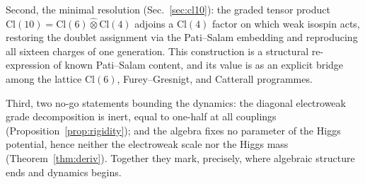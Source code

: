 \documentclass[12pt]{article}
\theoremstyle{remark}
\newcommand{\cl}{\mathrm{Cl}}
\newcommand{\grtensor}{\mathbin{\widehat{\otimes}}}  %
\begin{document}
Second, the minimal resolution (Sec.~\ref{sec:cl10}): the graded tensor product
$\cl(10)=\cl(6)\grtensor\cl(4)$ adjoins a $\cl(4)$ factor on which weak isospin
acts, restoring the doublet assignment via the Pati--Salam embedding and
reproducing all sixteen charges of one generation.  This construction is a
structural re-expression of known Pati--Salam content, and its value is as an
explicit bridge among the lattice $\cl(6)$, Furey--Gresnigt, and Catterall
programmes.

Third, two no-go statements bounding the dynamics: the diagonal electroweak
grade decomposition is inert, equal to one-half at all couplings
(Proposition~\ref{prop:rigidity}); and the algebra fixes no parameter of the
Higgs potential, hence neither the electroweak scale nor the Higgs mass
(Theorem~\ref{thm:deriv}).  Together they mark, precisely, where algebraic
structure ends and dynamics begins.
\end{document}
